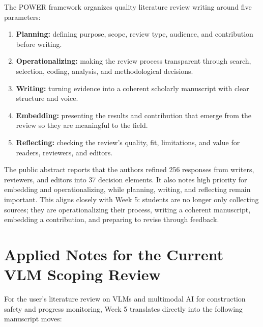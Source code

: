 \documentclass[10pt,letterpaper]{article}
\begin{document}
The POWER framework organizes quality literature review writing around five parameters:

\begin{enumerate}
\item \textbf{Planning:} defining purpose, scope, review type, audience, and contribution before writing.
\item \textbf{Operationalizing:} making the review process transparent through search, selection, coding, analysis, and methodological decisions.
\item \textbf{Writing:} turning evidence into a coherent scholarly manuscript with clear structure and voice.
\item \textbf{Embedding:} presenting the results and contribution that emerge from the review so they are meaningful to the field.
\item \textbf{Reflecting:} checking the review's quality, fit, limitations, and value for readers, reviewers, and editors.
\end{enumerate}

The public abstract reports that the authors refined 256 responses from writers, reviewers, and editors into 37 decision elements. It also notes high priority for embedding and operationalizing, while planning, writing, and reflecting remain important. This aligns closely with Week 5: students are no longer only collecting sources; they are operationalizing their process, writing a coherent manuscript, embedding a contribution, and preparing to revise through feedback.

\section{Applied Notes for the Current VLM Scoping Review}

For the user's literature review on VLMs and multimodal AI for construction safety and progress monitoring, Week 5 translates directly into the following manuscript moves:
\end{document}
